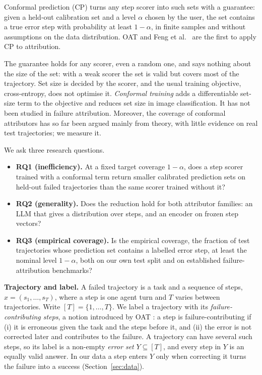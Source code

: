 \documentclass[10pt,a4paper]{article}
\makeatletter
\renewcommand\section{\@startsection{section}{1}{\z@}{9pt plus 2pt minus 1pt}{3pt}{\large\bfseries}}
\makeatother
\begin{document}
Conformal prediction (CP) \cite{angelopoulos2021gentle} turns any step scorer into such sets with a guarantee: given a held-out calibration set and a level $\alpha$ chosen by the user, the set contains a true error step with probability at least $1-\alpha$, in finite samples and without assumptions on the data distribution. OAT \cite{yeh2026oat} and Feng et al.\ \cite{feng2026conformal} are the first to apply CP to attribution.

The guarantee holds for any scorer, even a random one, and says nothing about the size of the set: with a weak scorer the set is valid but covers most of the trajectory. Set size is decided by the scorer, and the usual training objective, cross-entropy, does not optimise it. \emph{Conformal training} \cite{stutz2022conftr,shi2025dpsm} adds a differentiable set-size term to the objective and reduces set size in image classification. It has not been studied in failure attribution. Moreover, the coverage of conformal attributors has so far been argued mainly from theory, with little evidence on real test trajectories; we measure it.

We ask three research questions.
\begin{itemize}
\item \textbf{RQ1 (inefficiency).} At a fixed target coverage $1-\alpha$, does a step scorer trained with a conformal term return smaller calibrated prediction sets on held-out failed trajectories than the same scorer trained without it?
\item \textbf{RQ2 (generality).} Does the reduction hold for both attributor families: an LLM that gives a distribution over steps, and an encoder on frozen step vectors?
\item \textbf{RQ3 (empirical coverage).} Is the empirical coverage, the fraction of test trajectories whose prediction set contains a labelled error step, at least the nominal level $1-\alpha$, both on our own test split and on established failure-attribution benchmarks?
\end{itemize}

\section{Problem Setup}

\textbf{Trajectory and label.} A failed trajectory is a task and a sequence of steps, $x=(s_1,\dots,s_T)$, where a step is one agent turn and $T$ varies between trajectories. Write $[T]=\{1,\dots,T\}$. We label a trajectory with its \emph{failure-contributing steps}, a notion introduced by OAT \cite{yeh2026oat}: a step is failure-contributing if (i) it is erroneous given the task and the steps before it, and (ii) the error is not corrected later and contributes to the failure. A trajectory can have several such steps, so its label is a non-empty \emph{error set} $Y\subseteq[T]$, and every step in $Y$ is an equally valid answer. In our data a step enters $Y$ only when correcting it turns the failure into a success (Section~\ref{sec:data}).
\end{document}
